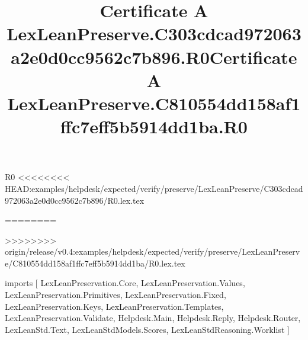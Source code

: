 \begin{lexlean}{R0}
<<<<<<<< HEAD:examples/helpdesk/expected/verify/preserve/LexLeanPreserve/C303cdcad972063a2e0d0cc9562c7b896/R0.lex.tex
\title{Certificate A LexLeanPreserve.C303cdcad972063a2e0d0cc9562c7b896.R0}
========
\title{Certificate A LexLeanPreserve.C810554dd158af1ffc7eff5b5914dd1ba.R0}
>>>>>>>> origin/release/v0.4:examples/helpdesk/expected/verify/preserve/LexLeanPreserve/C810554dd158af1ffc7eff5b5914dd1ba/R0.lex.tex
\begin{coremodule}
imports [
  LexLeanPreservation.Core,
  LexLeanPreservation.Values,
  LexLeanPreservation.Primitives,
  LexLeanPreservation.Fixed,
  LexLeanPreservation.Keys,
  LexLeanPreservation.Templates,
  LexLeanPreservation.Validate,
  Helpdesk.Main,
  Helpdesk.Reply,
  Helpdesk.Router,
  LexLeanStd.Text,
  LexLeanStdModels.Scores,
  LexLeanStdReasoning.Worklist
]


\end{coremodule}
\end{lexlean}
